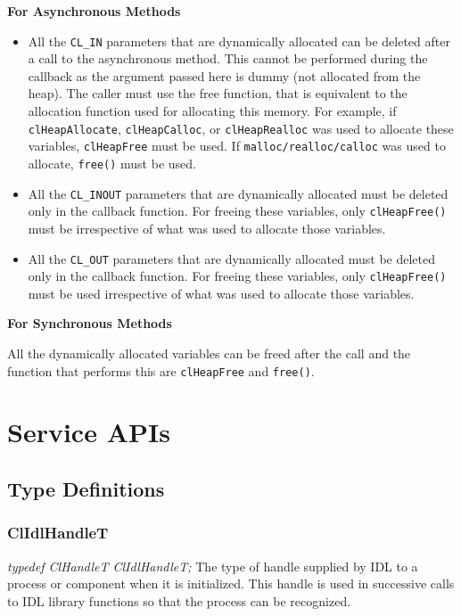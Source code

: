 \begin{flushleft}
\textbf{For Asynchronous Methods}
\begin{itemize}
\item
All the {\tt{CL\_\-IN}} parameters that are dynamically
                 allocated can be deleted after a call to the asynchronous method.
                 This cannot be performed during the callback as the argument
                 passed here is dummy (not allocated from the heap). The
                 caller must use the free function, that is equivalent to
                 the allocation function used for allocating this memory. For example,
                 if {\tt{clHeapAllocate}}, {\tt{clHeapCalloc}}, or {\tt{clHeapRealloc}}
                 was used to allocate these variables, {\tt{clHeapFree}}
                 must be used. If {\tt{malloc/realloc/calloc}} was used to
                 allocate, {\tt{free()}} must be used. 
                 \item
              All the {\tt{CL\_\-INOUT}} parameters that are dynamically
                 allocated must be deleted only in the callback function.
                 For freeing these variables, only {\tt{clHeapFree()}} must be
                 irrespective of what was used to allocate those
                 variables. 
                      \item
              All the {\tt{CL\_\-OUT}} parameters that are dynamically
                 allocated must be deleted only in the callback function.
                 For freeing these variables, only {\tt{clHeapFree()}} must be
                 used irrespective of what was used to allocate those
                 variables. 
                 \end{itemize}
 \textbf{For Synchronous Methods}

 All the dynamically allocated variables can be freed after the call and the function that performs this are {\tt{clHeapFree}} and {\tt{free()}}.
 




\chapter{Service APIs}



\section{Type Definitions}

\subsection{ClIdlHandleT}
\textit{typedef ClHandleT ClIdlHandleT;}
\newline
\newline
The type of handle supplied by IDL to a process or component when it is initialized. This handle is used in successive calls to IDL library functions 
so that the process can be recognized.


\end{flushleft}
